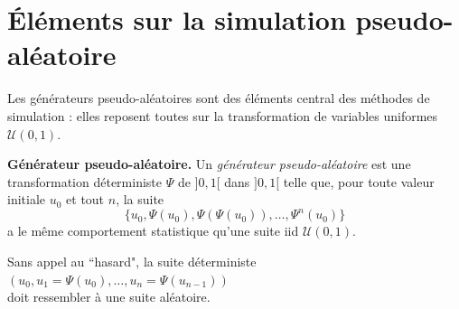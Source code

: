 \section{\'Eléments sur la simulation pseudo-aléatoire}\label{pseudoaleatoire}

Les générateurs pseudo-aléatoires sont des él\'ements central des m\'ethodes de simulation : elles reposent toutes sur la transformation de variables
uniformes $\mathcal{U}(0,1)$. \\

\begin{definition}{\bf G\'en\'erateur pseudo-al\'eatoire.}
Un \emph{g\'en\'erateur pseudo-al\'eatoire} est une transformation 
d\'eterministe $\Psi$ de $]0,1[$ dans $]0,1[$ telle que, pour toute valeur initiale $u_0$ et 
tout $n$, la suite 
$$
  \{ u_0,\Psi(u_0),\Psi(\Psi(u_0)),\ldots,\Psi^n(u_0) \}
$$
a le m\^eme comportement statistique qu'une suite iid $\mathcal{U}(0,1)$. 
\end{definition}

Sans appel au ``hasard", la suite d\'eterministe $(u_0,u_1=\Psi(u_0),
\ldots,u_n=\Psi(u_{n-1}))$\\ doit ressembler \`a une suite al\'eatoire.\\

